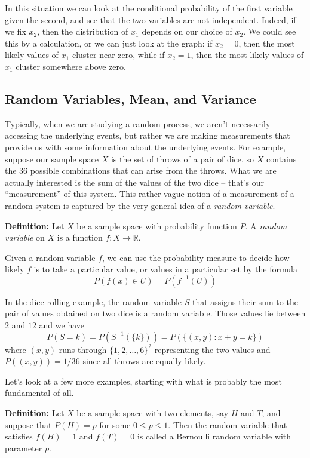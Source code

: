 \documentclass[
]{article}
\begin{document}
In this situation we can look at the conditional probability of the
first variable given the second, and see that the two variables are not
independent. Indeed, if we fix \(x_2\), then the distribution of \(x_1\)
depends on our choice of \(x_2\). We could see this by a calculation, or
we can just look at the graph: if \(x_2=0\), then the most likely values
of \(x_1\) cluster near zero, while if \(x_2=1\), then the most likely
values of \(x_1\) cluster somewhere above zero.

\hypertarget{random-variables-mean-and-variance}{%
\subsection{Random Variables, Mean, and
Variance}\label{random-variables-mean-and-variance}}

Typically, when we are studying a random process, we aren't necessarily
accessing the underlying events, but rather we are making measurements
that provide us with some information about the underlying events. For
example, suppose our sample space \(X\) is the set of throws of a pair
of dice, so \(X\) contains the \(36\) possible combinations that can
arise from the throws. What we are actually interested is the sum of the
values of the two dice -- that's our ``measurement'' of this system.
This rather vague notion of a measurement of a random system is captured
by the very general idea of a \emph{random variable}.

\textbf{Definition:} Let \(X\) be a sample space with probability
function \(P\). A \emph{random variable} on \(X\) is a function
\(f:X\to \mathbb{R}\).

Given a random variable \(f\), we can use the probability measure to
decide how likely \(f\) is to take a particular value, or values in a
particular set by the formula \[
P(f(x)\in U) = P(f^{-1}(U))
\]

In the dice rolling example, the random variable \(S\) that assigns
their sum to the pair of values obtained on two dice is a random
variable. Those values lie between \(2\) and \(12\) and we have \[
P(S=k) = P(S^{-1}(\{k\}))=P(\{(x,y): x+y=k\})
\] where \((x,y)\) runs through \(\{1,2,\ldots,6\}^{2}\) representing
the two values and \(P((x,y))=1/36\) since all throws are equally
likely.

Let's look at a few more examples, starting with what is probably the
most fundamental of all.

\textbf{Definition:} Let \(X\) be a sample space with two elements, say
\(H\) and \(T\), and suppose that \(P(H)=p\) for some \(0\le p\le 1\).
Then the random variable that satisfies \(f(H)=1\) and \(f(T)=0\) is
called a Bernoulli random variable with parameter \(p\).
\end{document}
